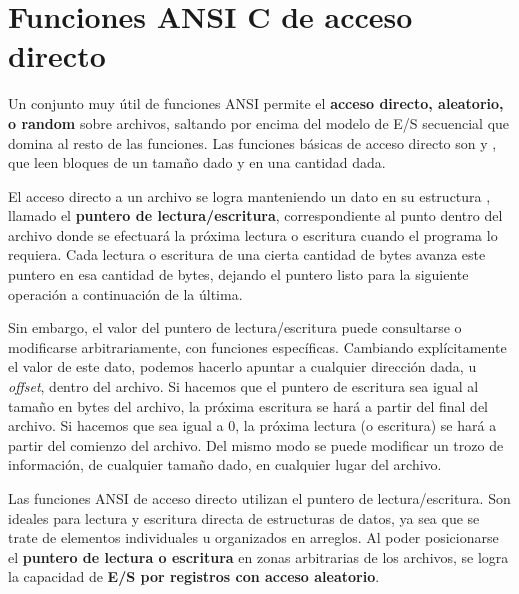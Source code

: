 \section{Funciones ANSI C de acceso directo}
\label{subsec:esarchivosansicdirect}

Un conjunto muy útil de funciones ANSI permite el \textbf{acceso directo, aleatorio, o
random} sobre archivos, saltando por encima del modelo de E/S secuencial que
domina al resto de las funciones. Las funciones básicas de acceso directo son
 y , que leen bloques de un tamaño dado y en una cantidad dada.

El acceso directo a un archivo se logra manteniendo un dato en su estructura , 
llamado el \textbf{puntero de lectura/escritura},
correspondiente al punto dentro del archivo donde se efectuará la próxima lectura o escritura  
cuando el programa lo requiera. Cada lectura o escritura de una cierta cantidad de bytes
avanza este puntero en esa cantidad de bytes, dejando el puntero listo para la siguiente 
operación a continuación de la última.
 
Sin embargo, el valor del puntero de lectura/escritura puede consultarse o modificarse arbitrariamente, con funciones específicas. Cambiando explícitamente el valor de este dato, podemos hacerlo  
apuntar a cualquier dirección dada, u \textit{offset}, dentro del archivo. Si hacemos que el puntero de escritura sea 
igual al tamaño en bytes del archivo, la próxima escritura se hará a partir del final del
archivo. Si hacemos que sea igual a 0, la próxima lectura (o escritura) se hará a partir del comienzo del archivo. Del mismo modo se puede modificar un trozo de información, de cualquier tamaño dado, en cualquier lugar del archivo. 

Las funciones ANSI de acceso directo utilizan el puntero de lectura/escritura. Son ideales para lectura y escritura directa de estructuras de datos, ya sea que se trate de elementos individuales u organizados en arreglos. Al poder
posicionarse el \textbf{puntero de lectura o escritura} en zonas arbitrarias de los
archivos, se logra la capacidad de \textbf{E/S por registros con acceso aleatorio}.


